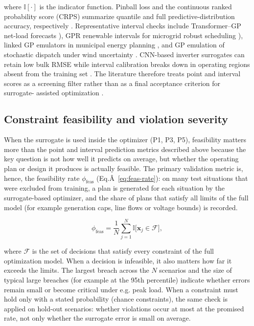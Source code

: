 \documentclass[final,5p,times,twocolumn]{elsarticle}
\begin{document}
where $\mathbb{I}[\cdot]$ is the indicator function. Pinball loss and
the continuous ranked probability score (CRPS) summarize quantile and
full predictive-distribution accuracy, respectively
\cite{Hu2024,Sun20191497}. Representative interval checks include
Transformer--GP net-load forecasts \cite{Hu2024}), GPR renewable intervals
for microgrid robust scheduling \cite{Yang2024__2}), linked GP emulators in
municipal energy planning \cite{Volodina2022,Lawson201647}, and GP
emulation of stochastic dispatch under wind uncertainty
\cite{Hu2020,Hu2021671}. CNN-based inverter surrogates can retain low bulk
RMSE while interval calibration breaks down in operating regions absent
from the training set \cite{Subedi2026157}. The literature therefore treats
point and interval scores as a screening filter rather than as a final
acceptance criterion for surrogate- assisted optimization
\cite{Khaloie2025,Lim2025}.

\subsection{Constraint feasibility and violation severity}
\label{sec:val:feasibility}

When the surrogate is used inside the optimizer (P1, P3, P5),
feasibility matters more than the point and interval prediction metrics
described above because the key question is not how well it predicts on
average, but whether the operating plan or design it produces is
actually feasible. The primary validation metric is, hence, the
feasibility rate $\phi_{\mathrm{feas}}$
(Eq.Â~\eqref{eq:feas-rate}): on many test situations that were excluded
from training, a plan is generated for each situation by the
surrogate-based optimizer, and the share of plans that satisfy all
limits of the full model (for example generation caps, line flows or
voltage bounds) is recorded.

$$\begin{equation}
  \phi_{\mathrm{feas}}
    = \frac{1}{N}\sum_{j=1}^{N}
      \mathbb{I}\!\big[\mathbf{x}_j \in \mathcal{F}\big],
  \label{eq:feas-rate}
\end{equation}$$

where $\mathcal{F}$ is the set of decisions that satisfy every
constraint of the full optimization model. When a decision is
infeasible, it also matters how far it exceeds the limits. The largest
breach across the $N$ scenarios and the size of typical large breaches
(for example at the 95th percentile) indicate whether errors remain
small or become critical under e.g. peak load. When a constraint must
hold only with a stated probability (chance constraints), the same check
is applied on hold-out scenarios: whether violations occur at most at
the promised rate, not only whether the surrogate error is small on
average.
\end{document}
